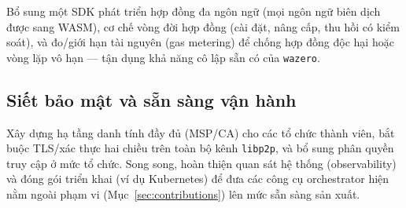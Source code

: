 Bổ sung một SDK phát triển hợp đồng đa ngôn ngữ (mọi ngôn ngữ biên dịch
được sang WASM), cơ chế vòng đời hợp đồng (cài đặt, nâng cấp, thu hồi có
kiểm soát), và đo/giới hạn tài nguyên (gas metering) để chống hợp đồng
độc hại hoặc vòng lặp vô hạn --- tận dụng khả năng cô lập sẵn có của
\texttt{wazero}.

\subsection{Siết bảo mật và sẵn sàng vận hành}
\label{sec:fw-security}

Xây dựng hạ tầng danh tính đầy đủ (MSP/CA) cho các tổ chức thành viên, bắt buộc
TLS/xác thực hai chiều trên toàn bộ kênh \texttt{libp2p}, và bổ sung phân quyền
truy cập ở mức tổ chức. Song song, hoàn thiện quan sát hệ thống (observability)
và đóng gói triển khai (ví dụ Kubernetes) để đưa các công cụ orchestrator hiện
nằm ngoài phạm vi (Mục~\ref{sec:contributions}) lên mức sẵn sàng sản xuất.
